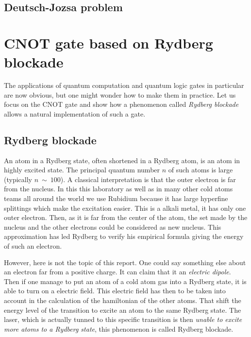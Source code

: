 \documentclass[%
]{scrreprt}
\begin{document}
\subsection{Deutsch-Jozsa problem}

\par 

\section{CNOT gate based on Rydberg blockade}

\par The applications of quantum computation and quantum logic gates in particular are now obvious, but one might wonder how to make them in practice. Let us focus on the CNOT gate and show how a phenomenon called \emph{Rydberg blockade} allows a natural implementation of such a gate.

\subsection{Rydberg blockade}

\par An atom in a Rydberg state, often shortened in a Rydberg atom, is an atom in highly excited state. The principal quantum number $n$ of such atoms is large (typically $n~\sim~100$). A classical interpretation is that the outer electron is far from the nucleus. In this this laboratory as well as in many other cold atoms teams all around the world we use Rubidium because it has large hyperfine splittings which make the excitation easier. This is a alkali metal, it has only one outer electron. Then, as it is far from the center of the atom, the set made by the nucleus and the other electrons could be considered as new nucleus. This approximation has led Rydberg to verify his empirical formula giving the energy of such an electron.

\par However, here is not the topic of this report. One could say something else about an electron far from a positive charge. It can claim that it an \emph{electric dipole}. Then if one manage to put an atom of a cold atom gas into a Rydberg state, it is able to turn on a electric field. This electric field has then to be taken into account in the calculation of the hamiltonian of the other atoms. That shift the energy level of the transition to excite an atom to the same Rydberg state. The laser, which is actually tunned to this specific transition is then \emph{unable to excite more atoms to a Rydberg state}, this phenomenon is called Rydberg blockade.
\end{document}
